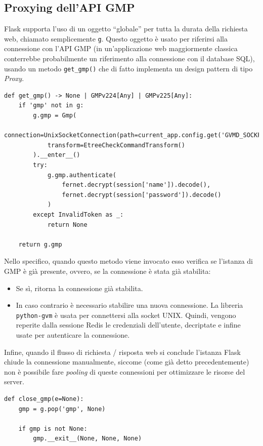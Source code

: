 \subsection{Proxying dell'API GMP}
Flask supporta l'uso di un oggetto ``globale'' per tutta la durata della richiesta web, chiamato semplicemente \texttt{g}. Questo oggetto è usato per riferirsi alla connessione con l'API GMP (in un'applicazione web maggiormente classica conterrebbe probabilmente un riferimento alla connessione con il database SQL), usando un metodo \texttt{get\_gmp()} che di fatto implementa un design pattern di tipo \emph{Proxy}.

\begin{lstlisting}[caption={Metodo proxy per la connessione GMP}]
def get_gmp() -> None | GMPv224[Any] | GMPv225[Any]:
    if 'gmp' not in g:
        g.gmp = Gmp(
            connection=UnixSocketConnection(path=current_app.config.get('GVMD_SOCKFILE')),
            transform=EtreeCheckCommandTransform()
        ).__enter__()
        try:
            g.gmp.authenticate(
                fernet.decrypt(session['name']).decode(),
                fernet.decrypt(session['password']).decode()
            )
        except InvalidToken as _:
            return None

    return g.gmp
\end{lstlisting}

Nello specifico, quando questo metodo viene invocato esso verifica se l'istanza di GMP è già presente, ovvero, se la connessione è stata già stabilita:
\begin{itemize}
    \item Se sì, ritorna la connessione già stabilita.
    \item In caso contrario è necessario stabilire una nuova connessione. La libreria \texttt{python-gvm} è usata per connettersi alla socket UNIX. Quindi, vengono reperite dalla sessione Redis le credenziali dell'utente, decriptate e infine usate per autenticare la connessione.
\end{itemize}

Infine, quando il flusso di richiesta / risposta web si conclude l'istanza Flask chiude la connessione manualmente, siccome (come già detto precedentemente) non è possibile fare \emph{pooling} di queste connessioni per ottimizzare le risorse del server.

\begin{lstlisting}[caption={Metodo di chiusura delle connessioni GMP}]
def close_gmp(e=None):
    gmp = g.pop('gmp', None)

    if gmp is not None:
        gmp.__exit__(None, None, None)
\end{lstlisting}

